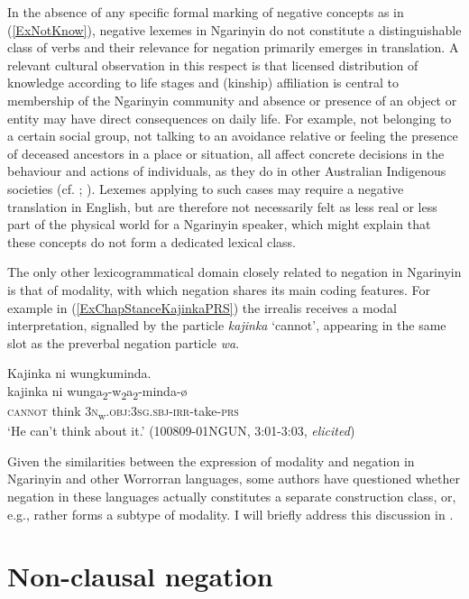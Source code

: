 \documentclass[output=paper,colorlinks,citecolor=brown]{langscibook}
\begin{document}
In the absence of any specific formal marking of negative concepts as in (\ref{ExNotKnow}), negative lexemes in Ngarinyin do not constitute a distinguishable class of verbs and their relevance for negation primarily emerges in translation. A relevant cultural observation in this respect is that licensed distribution of knowledge according to life stages and (kinship) affiliation is central to membership of the Ngarinyin community and absence or presence of an object or entity may have direct consequences on daily life. For example, not belonging to a certain social group, not talking to an avoidance relative or feeling the presence of deceased ancestors in a place or situation, all affect concrete decisions in the behaviour and actions of individuals, as they do in other Australian Indigenous societies (cf. \citealt{Fleming2014}; \citealt{Merlan2020}). Lexemes applying to such cases may require a negative translation in English, but are therefore not necessarily felt as less real or less part of the physical world for a Ngarinyin speaker, which might explain that these concepts do not form a dedicated lexical class.

The only other lexicogrammatical domain closely related to negation in Ngarinyin is that of modality, with which negation shares its main coding features. For example in (\ref{ExChapStanceKajinkaPRS}) the irrealis receives a modal interpretation, signalled by the particle \textit{kajinka} `cannot', appearing in the same slot as the preverbal negation particle \textit{wa}.

\begin{exe}
\ex \label{ExChapStanceKajinkaPRS}
\glll Kajinka ni wungkuminda.\\
kajinka ni wunga\textsubscript{2}-w\textsubscript{2}a\textsubscript{2}-minda-{\o}\\
\textsc{cannot} think 3\textsc{n}\textsubscript{w}.\textsc{obj:3sg.sbj-irr}-take-\textsc{prs}\\
\trans `He can't think about it.' (100809-01NGUN, 3:01-3:03, \textit{elicited})
\end{exe}

Given the similarities between the expression of modality and negation in Ngarinyin and other Worrorran languages, some authors have questioned whether negation in these languages actually constitutes a separate construction class, or, e.g., rather forms a subtype of modality. I will briefly address this discussion in .

\section{Non-clausal negation} \label{SecNonClausalNEG}
\end{document}
